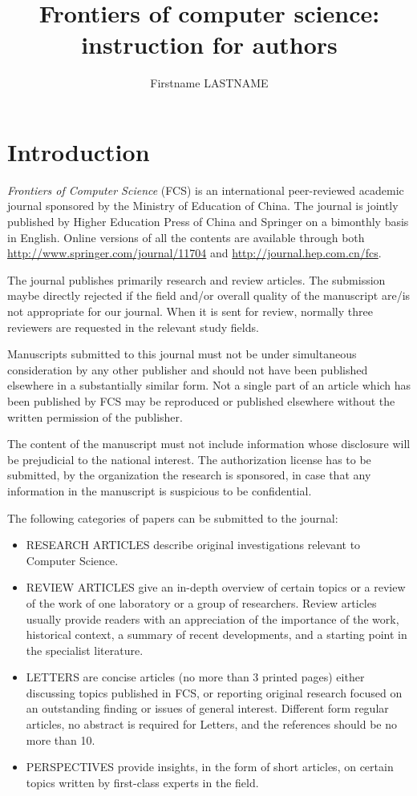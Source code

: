 \documentclass[review]{fcs}
\title{Frontiers of computer science: instruction for authors}
\author*[1,2]{Firstname LASTNAME}
\begin{document}
\section{Introduction}

\emph{Frontiers of Computer Science} (FCS) is an international peer-reviewed academic journal sponsored by the Ministry of Education of China. The journal is jointly published by Higher Education Press of China and Springer on a bimonthly basis in English. Online versions of all the contents are available through both \url{http://www.springer.com/journal/11704} and \url{http://journal.hep.com.cn/fcs}.

The journal publishes primarily research and review articles. The submission maybe directly rejected if the field and/or overall quality of the manu\-script are/is not appropriate for our journal. When it is sent for review, normally three reviewers are requested in the relevant study fields. 

Manuscripts submitted to this journal must not be under simultaneous consideration by any other publisher and should not have been published elsewhere in a substantially similar form. Not a single part of an article which has been published by FCS may be reproduced or published elsewhere without the written permission of the publisher.

The content of the manuscript must not include information whose disclosure will be prejudicial to the national interest. The authorization license has to be submitted, by the organization the research is sponsored, in case that any information in the manuscript is suspicious to be confidential.

The following categories of papers can be submitted to the journal:

\begin{itemize}
\item RESEARCH ARTICLES describe original investigations relevant to Computer Science.
\item REVIEW ARTICLES give an in-depth over\-view of certain topics or a review of the work of one laboratory or a group of researchers. Review articles usually provide readers with an appreciation of the importance of the work, historical context, a summary of recent developments, and a starting point in the specialist literature.
\item LETTERS are concise articles (no more than 3 printed pages) either discussing topics published in FCS, or reporting original research focused on an outstanding finding or issues of general interest. Different form regular articles, no abstract is required for Letters, and the references should be no more than 10.
\item PERSPECTIVES provide insights, in the form of short articles, on certain topics written by first-class experts in the field.
\end{itemize}
\end{document}
